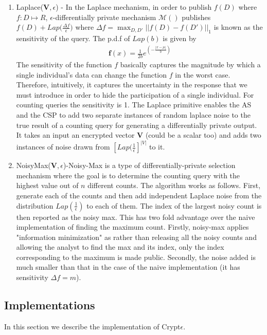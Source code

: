 \begin{enumerate}
	\item Laplace($\mathbf{V},\epsilon$) - In the Laplace mechanism, in order
to publish $f(D)$ where $f : D \mapsto R$, $\epsilon$-differentially private mechanism $\mathcal{M()}$ 
publishes $f(D) + Lap\Big(\frac{\Delta f}{\epsilon}\Big)$  
where $\Delta f = \max_{D,D'}||f(D)-f(D')||_1$ is known as the sensitivity of the query. The p.d.f of $Lap(b)$ is given by\begin{gather}\mathbf{f}(x)={\frac  {1}{2b}}e^{ \left(-{\frac  {|x-\mu |}{b}}\right)}\end{gather} The sensitivity of the function $f$ basically captures the magnitude by which a single individual’s data can change the function $f$ in the worst case. Therefore, intuitively, it captures the uncertainty in the response that we must introduce in order to hide the participation of a single individual. For counting queries the sensitivity is 1. The Laplace primitive enables the \textsf{AS} and the CSP to add two separate instances of random laplace noise to the true result of a counting query for generating a differentially private output. It takes an input an encrypted vector $\mathbf{V}$ (could be a scalar too) and adds two instances of noise drawn from $[Lap(\frac{1}{\epsilon}]^{|V|}$ to it.

	\item NoisyMax($\mathbf{V},\epsilon$)-Noisy-Max is a type of differentially-private selection mechanism where the goal is to determine the counting query with the highest value out of $n$ different counts.  
	The algorithm works as follows. First, generate each of the counts and then add independent Laplace noise from the distribution $Lap(\frac{1}{\epsilon})$ to each of them. The index of the largest noisy count is then reported as the noisy max.
	This has two fold advantage over the naive implementation of finding the maximum count.
Firstly, noisy-max applies "information minimization" as rather than releasing all the noisy counts
and allowing the analyst to find the max and its index, only the
index corresponding to the maximum is made public.
Secondly, the noise added is much smaller than that in the case of the naive implementation (it has sensitivity $\Delta f=m$).  

\end{enumerate}
\subsection{Implementations}\label{implementation}
In this section we describe the implementation of Crypt$\epsilon$.
